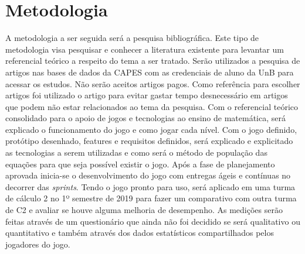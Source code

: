 \chapter[Metodologia]{Metodologia}
A metodologia a ser seguida será a pesquisa bibliográfica. Este tipo de metodologia visa pesquisar e conhecer a literatura existente para levantar um referencial teórico a respeito do tema a ser tratado. Serão utilizados a pesquisa de artigos nas bases de dados da CAPES com as credenciais de aluno da UnB para acessar os estudos. Não serão aceitos artigos pagos. 
Como referência para escolher artigos foi utilizado o artigo \cite{howtoread} para evitar gastar tempo desnecessário em artigos que podem não estar relacionados ao tema da pesquisa.
Com o referencial teórico consolidado para o apoio de jogos e tecnologias ao ensino de matemática, será explicado o funcionamento do jogo e como jogar cada nível. Com o jogo definido, protótipo desenhado, features e requisitos definidos, será explicado e explicitado as tecnologias a serem utilizadas e como será o método de população das equações para que seja possível existir o jogo.
Após a fase de planejamento aprovada inicia-se o desenvolvimento do jogo com entregas ágeis e contínuas no decorrer das \textit{sprints}.
Tendo o jogo pronto para uso, será aplicado em uma turma de cálculo 2 no 1º semestre de 2019 para fazer um comparativo com outra turma de C2 e avaliar se houve alguma melhoria de desempenho. As medições serão feitas através de um questionário que ainda não foi decidido se será qualitativo ou quantitativo e também através dos dados estatísticos compartilhados pelos jogadores do jogo.




